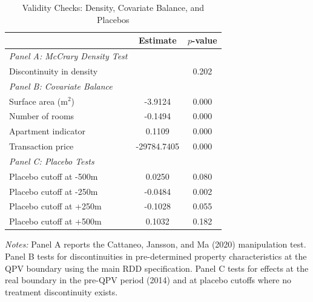 \begin{table}[htbp]
\centering
\caption{Validity Checks: Density, Covariate Balance, and Placebos}
\label{tab:validity}
\begin{threeparttable}
\begin{tabular}{lcc}
\toprule
 & Estimate & $p$-value \\
\midrule
\textit{Panel A: McCrary Density Test} & & \\
Discontinuity in density & & 0.202 \\
\midrule
\textit{Panel B: Covariate Balance} & & \\
Surface area (m$^2$) & -3.9124 & 0.000 \\
Number of rooms & -0.1494 & 0.000 \\
Apartment indicator & 0.1109 & 0.000 \\
Transaction price & -29784.7405 & 0.000 \\
\midrule
\textit{Panel C: Placebo Tests} & & \\
Placebo cutoff at -500m & 0.0250 & 0.080 \\
Placebo cutoff at -250m & -0.0484 & 0.002 \\
Placebo cutoff at +250m & -0.1028 & 0.055 \\
Placebo cutoff at +500m & 0.1032 & 0.182 \\
\bottomrule
\end{tabular}
\begin{tablenotes}
\small
\item \textit{Notes:} Panel A reports the Cattaneo, Jansson, and Ma (2020) manipulation test. Panel B tests for discontinuities in pre-determined property characteristics at the QPV boundary using the main RDD specification. Panel C tests for effects at the real boundary in the pre-QPV period (2014) and at placebo cutoffs where no treatment discontinuity exists.
\end{tablenotes}
\end{threeparttable}
\end{table}
